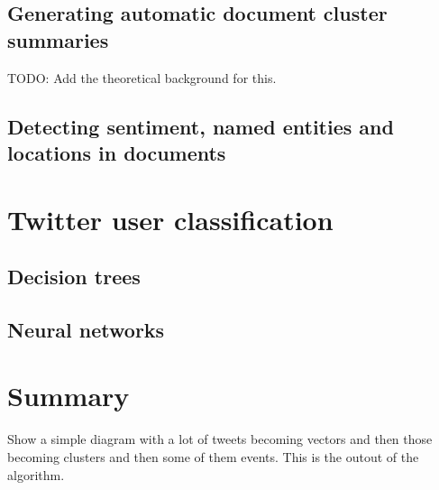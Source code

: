 \subsection{Generating automatic document cluster summaries}
TODO: Add the theoretical background for this.

\subsection{Detecting sentiment, named entities and locations in documents}


\section{Twitter user classification}

\subsection{Decision trees}

\subsection{Neural networks}

\section{Summary}

Show a simple diagram with a lot of tweets becoming vectors and then those becoming clusters and then some of them events.
This is the outout of the algorithm.


